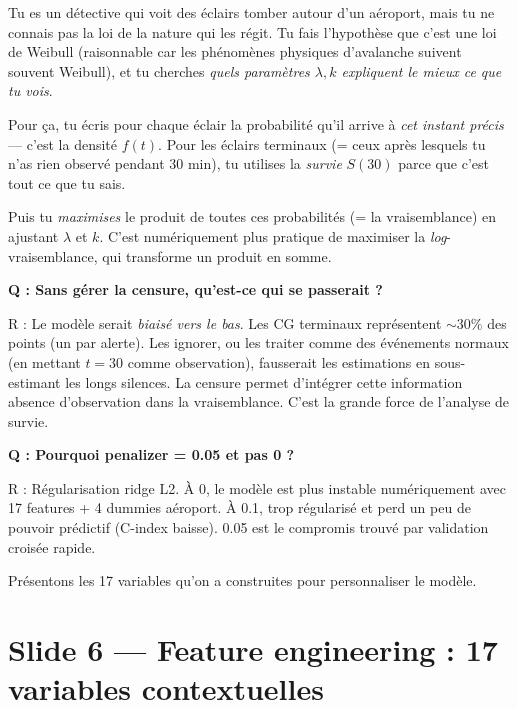 \documentclass[11pt,a4paper]{article}
\begin{document}
\begin{tcolorbox}[colback=purple!5,colframe=purple!50!black,title=\textbf{Analogie : MLE comme un détective}]
Tu es un détective qui voit des éclairs tomber autour d'un aéroport, mais tu ne connais pas
\og la loi de la nature \fg{} qui les régit. Tu fais l'hypothèse que c'est une loi de
Weibull (raisonnable car les phénomènes physiques d'avalanche suivent souvent Weibull),
et tu cherches \emph{quels paramètres $\lambda, k$ expliquent le mieux ce que tu vois}.

Pour ça, tu écris pour chaque éclair la probabilité qu'il arrive à \emph{cet instant
précis} — c'est la densité $f(t)$. Pour les éclairs \og terminaux \fg{} (= ceux après
lesquels tu n'as rien observé pendant 30 min), tu utilises la \emph{survie} $S(30)$
parce que c'est tout ce que tu sais.

Puis tu \emph{maximises} le produit de toutes ces probabilités (= la vraisemblance) en
ajustant $\lambda$ et $k$. C'est numériquement plus pratique de maximiser la
\emph{log}-vraisemblance, qui transforme un produit en somme.
\end{tcolorbox}

\begin{piege}
\textbf{Q : Sans gérer la censure, qu'est-ce qui se passerait ?}

R : Le modèle serait \emph{biaisé vers le bas}. Les CG terminaux représentent $\sim 30 \%$
des points (un par alerte). Les ignorer, ou les traiter comme des événements normaux
(en mettant $t = 30$ comme observation), fausserait les estimations en sous-estimant
les longs silences. La censure permet d'intégrer cette information \og absence
d'observation \fg{} dans la vraisemblance. C'est la grande force de l'analyse de survie.

\textbf{Q : Pourquoi penalizer = 0.05 et pas 0 ?}

R : Régularisation ridge L2. À 0, le modèle est plus instable numériquement avec
17 features + 4 dummies aéroport. À 0.1, trop régularisé et perd un peu de pouvoir
prédictif (C-index baisse). 0.05 est le compromis trouvé par validation croisée rapide.
\end{piege}

\begin{transit}
\og Présentons les 17 variables qu'on a construites pour personnaliser le modèle. \fg{}
\end{transit}

\section{Slide 6 — Feature engineering : 17 variables contextuelles}
\end{document}

